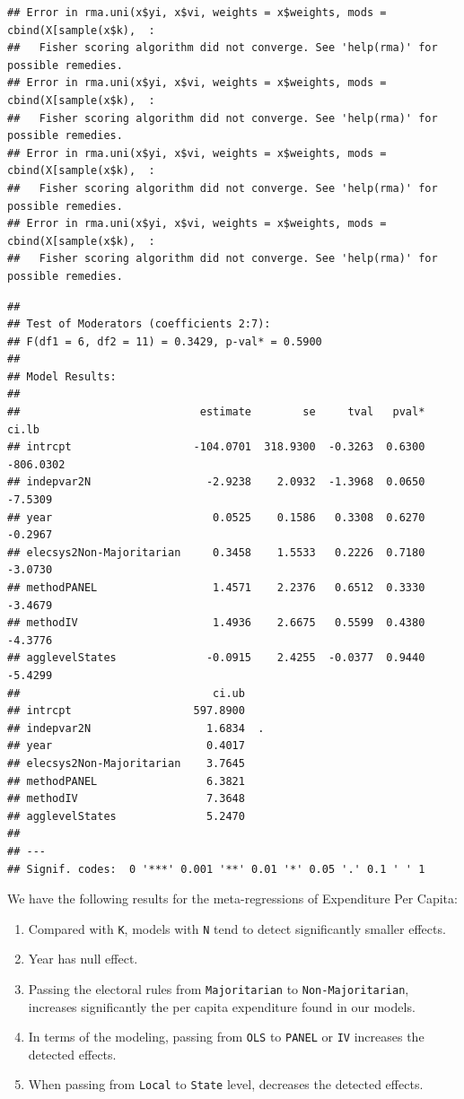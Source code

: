 \documentclass[
]{article}
\providecommand{\tightlist}{%
  \setlength{\itemsep}{0pt}\setlength{\parskip}{0pt}}
\begin{document}
\begin{verbatim}
## Error in rma.uni(x$yi, x$vi, weights = x$weights, mods = cbind(X[sample(x$k),  : 
##   Fisher scoring algorithm did not converge. See 'help(rma)' for possible remedies.
## Error in rma.uni(x$yi, x$vi, weights = x$weights, mods = cbind(X[sample(x$k),  : 
##   Fisher scoring algorithm did not converge. See 'help(rma)' for possible remedies.
## Error in rma.uni(x$yi, x$vi, weights = x$weights, mods = cbind(X[sample(x$k),  : 
##   Fisher scoring algorithm did not converge. See 'help(rma)' for possible remedies.
## Error in rma.uni(x$yi, x$vi, weights = x$weights, mods = cbind(X[sample(x$k),  : 
##   Fisher scoring algorithm did not converge. See 'help(rma)' for possible remedies.
\end{verbatim}

\begin{verbatim}
## 
## Test of Moderators (coefficients 2:7):
## F(df1 = 6, df2 = 11) = 0.3429, p-val* = 0.5900
## 
## Model Results:
## 
##                            estimate        se     tval   pval*      ci.lb 
## intrcpt                   -104.0701  318.9300  -0.3263  0.6300  -806.0302 
## indepvar2N                  -2.9238    2.0932  -1.3968  0.0650    -7.5309 
## year                         0.0525    0.1586   0.3308  0.6270    -0.2967 
## elecsys2Non-Majoritarian     0.3458    1.5533   0.2226  0.7180    -3.0730 
## methodPANEL                  1.4571    2.2376   0.6512  0.3330    -3.4679 
## methodIV                     1.4936    2.6675   0.5599  0.4380    -4.3776 
## agglevelStates              -0.0915    2.4255  -0.0377  0.9440    -5.4299 
##                              ci.ub 
## intrcpt                   597.8900    
## indepvar2N                  1.6834  . 
## year                        0.4017    
## elecsys2Non-Majoritarian    3.7645    
## methodPANEL                 6.3821    
## methodIV                    7.3648    
## agglevelStates              5.2470    
## 
## ---
## Signif. codes:  0 '***' 0.001 '**' 0.01 '*' 0.05 '.' 0.1 ' ' 1
\end{verbatim}

We have the following results for the meta-regressions of Expenditure
Per Capita:

\begin{enumerate}
\def\labelenumi{\arabic{enumi}.}
\tightlist
\item
  Compared with \texttt{K}, models with \texttt{N} tend to detect
  significantly smaller effects.
\item
  Year has null effect.
\item
  Passing the electoral rules from \texttt{Majoritarian} to
  \texttt{Non-Majoritarian}, increases significantly the per capita
  expenditure found in our models.
\item
  In terms of the modeling, passing from \texttt{OLS} to \texttt{PANEL}
  or \texttt{IV} increases the detected effects.
\item
  When passing from \texttt{Local} to \texttt{State} level, decreases
  the detected effects.
\end{enumerate}
\end{document}
